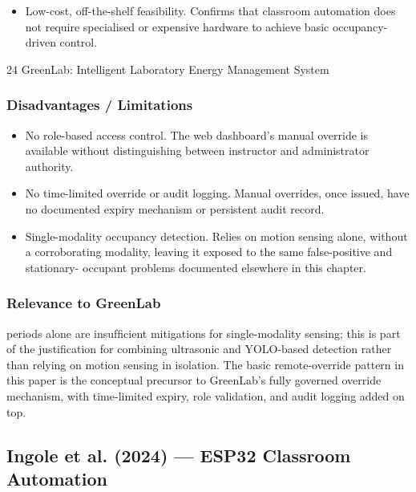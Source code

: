 \begin{itemize}
  \item Low-cost, off-the-shelf feasibility. Conﬁrms that classroom automation does not
require specialised or expensive hardware to achieve basic occupancy-driven control.
\end{itemize}

24
GreenLab: Intelligent Laboratory Energy Management System



\subsubsection*{Disadvantages / Limitations}


\begin{itemize}
  \item No role-based access control. The web dashboard's manual override is available
without distinguishing between instructor and administrator authority.
\end{itemize}

\begin{itemize}
  \item No time-limited override or audit logging. Manual overrides, once issued, have no
documented expiry mechanism or persistent audit record.
\end{itemize}

\begin{itemize}
  \item Single-modality occupancy detection. Relies on motion sensing alone, without a
corroborating modality, leaving it exposed to the same false-positive and stationary-
occupant problems documented elsewhere in this chapter.
\end{itemize}



\subsubsection*{Relevance to GreenLab}

periods alone are insufﬁcient mitigations for single-modality sensing; this is part of the
justiﬁcation for combining ultrasonic and YOLO-based detection rather than relying on
motion sensing in isolation. The basic remote-override pattern in this paper is the conceptual precursor to GreenLab's fully governed override mechanism, with time-limited expiry,
role validation, and audit logging added on top.


\subsection{Ingole et al. (2024) --- ESP32 Classroom Automation}


